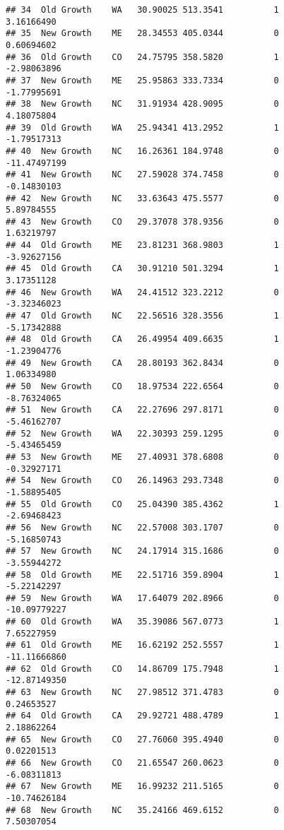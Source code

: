 \documentclass[
]{article}
\begin{document}
\begin{verbatim}
## 34  Old Growth    WA   30.90025 513.3541          1          3.16166490
## 35  New Growth    ME   28.34553 405.0344          0          0.60694602
## 36  Old Growth    CO   24.75795 358.5820          1         -2.98063896
## 37  New Growth    ME   25.95863 333.7334          0         -1.77995691
## 38  New Growth    NC   31.91934 428.9095          0          4.18075804
## 39  Old Growth    WA   25.94341 413.2952          1         -1.79517313
## 40  New Growth    NC   16.26361 184.9748          0        -11.47497199
## 41  New Growth    NC   27.59028 374.7458          0         -0.14830103
## 42  New Growth    NC   33.63643 475.5577          0          5.89784555
## 43  New Growth    CO   29.37078 378.9356          0          1.63219797
## 44  Old Growth    ME   23.81231 368.9803          1         -3.92627156
## 45  Old Growth    CA   30.91210 501.3294          1          3.17351128
## 46  New Growth    WA   24.41512 323.2212          0         -3.32346023
## 47  Old Growth    NC   22.56516 328.3556          1         -5.17342888
## 48  Old Growth    CA   26.49954 409.6635          1         -1.23904776
## 49  New Growth    CA   28.80193 362.8434          0          1.06334980
## 50  New Growth    CO   18.97534 222.6564          0         -8.76324065
## 51  New Growth    CA   22.27696 297.8171          0         -5.46162707
## 52  New Growth    WA   22.30393 259.1295          0         -5.43465459
## 53  New Growth    ME   27.40931 378.6808          0         -0.32927171
## 54  New Growth    CO   26.14963 293.7348          0         -1.58895405
## 55  Old Growth    CO   25.04390 385.4362          1         -2.69468423
## 56  New Growth    NC   22.57008 303.1707          0         -5.16850743
## 57  New Growth    NC   24.17914 315.1686          0         -3.55944272
## 58  Old Growth    ME   22.51716 359.8904          1         -5.22142297
## 59  New Growth    WA   17.64079 202.8966          0        -10.09779227
## 60  Old Growth    WA   35.39086 567.0773          1          7.65227959
## 61  Old Growth    ME   16.62192 252.5557          1        -11.11666860
## 62  Old Growth    CO   14.86709 175.7948          1        -12.87149350
## 63  New Growth    NC   27.98512 371.4783          0          0.24653527
## 64  Old Growth    CA   29.92721 488.4789          1          2.18862264
## 65  New Growth    CO   27.76060 395.4940          0          0.02201513
## 66  New Growth    CO   21.65547 260.0623          0         -6.08311813
## 67  New Growth    ME   16.99232 211.5165          0        -10.74626184
## 68  New Growth    NC   35.24166 469.6152          0          7.50307054

\end{verbatim}
\end{document}
